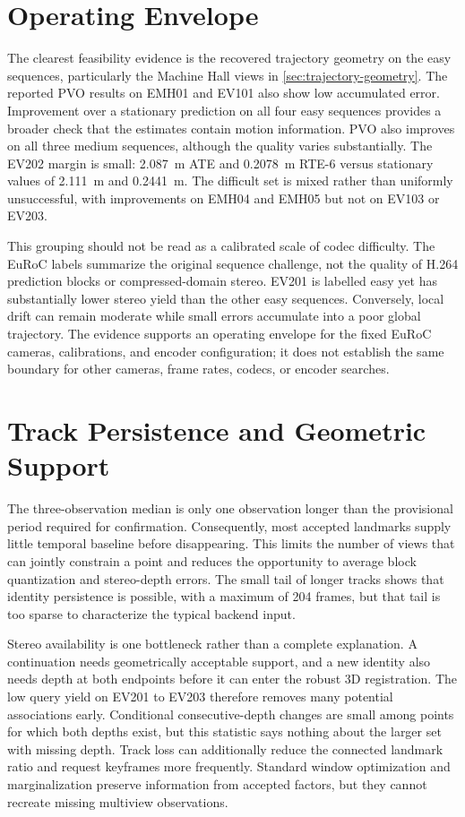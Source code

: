 \section{Operating Envelope}

The clearest feasibility evidence is the recovered trajectory geometry on the
easy sequences, particularly the Machine Hall views in
\autoref{sec:trajectory-geometry}. The reported PVO results on EMH01 and EV101
also show low accumulated error. Improvement over a stationary prediction on
all four easy sequences provides a broader check that the estimates contain
motion information. PVO also improves on all three medium sequences, although
the quality varies substantially. The EV202 margin is small: \SI{2.087}{\metre} ATE and
\SI{0.2078}{\metre} RTE-6 versus stationary values of \SI{2.111}{\metre} and
\SI{0.2441}{\metre}. The difficult set is mixed rather than uniformly
unsuccessful, with improvements on EMH04 and EMH05 but not on EV103 or EV203.

This grouping should not be read as a calibrated scale of codec difficulty.
The EuRoC labels summarize the original sequence challenge, not the quality of
H.264 prediction blocks or compressed-domain stereo. EV201 is labelled easy yet
has substantially lower stereo yield than the other easy sequences. Conversely,
local drift can remain moderate while small errors accumulate into a poor
global trajectory. The evidence supports an operating envelope for the fixed
EuRoC cameras, calibrations, and encoder configuration; it does not establish
the same boundary for other cameras, frame rates, codecs, or encoder searches.

\section{Track Persistence and Geometric Support}

The three-observation median is only one observation longer than the provisional
period required for confirmation. Consequently, most accepted landmarks supply
little temporal baseline before disappearing. This limits the number of views
that can jointly constrain a point and reduces the opportunity to average block
quantization and stereo-depth errors. The small tail of longer tracks shows that
identity persistence is possible, with a maximum of 204 frames, but that tail is
too sparse to characterize the typical backend input.

Stereo availability is one bottleneck rather than a complete explanation. A
continuation needs geometrically acceptable support, and a new identity also
needs depth at both endpoints before it can enter the robust 3D registration.
The low query yield on EV201 to EV203 therefore removes many potential
associations early. Conditional consecutive-depth changes are small among
points for which both depths exist, but this statistic says nothing about the
larger set with missing depth. Track loss can additionally reduce the connected
landmark ratio and request keyframes more frequently. Standard window
optimization and marginalization preserve information from accepted factors,
but they cannot recreate missing multiview observations.

